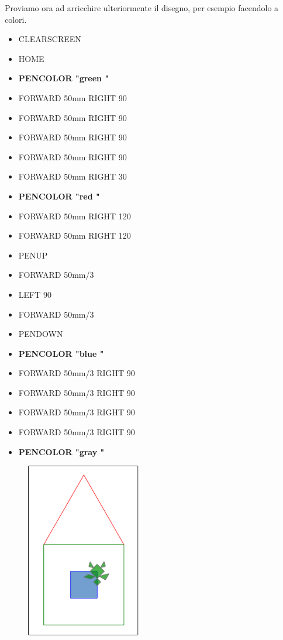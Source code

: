\vskip 1cm

Proviamo ora ad arricchire ulteriormente il disegno, per esempio facendolo a colori.  

\vskip 1cm

\begin{scriptsize}
\begin{minipage}{0.40\textwidth}
\begin{itemize}[itemsep=-3pt,parsep=2pt]
\item[] CLEARSCREEN             
\item[] HOME
\item[] \textbf{PENCOLOR  "green "}
\item[] FORWARD 50mm RIGHT 90
\item[] FORWARD 50mm RIGHT 90
\item[] FORWARD 50mm RIGHT 90
\item[] FORWARD 50mm RIGHT 90
\item[] FORWARD 50mm RIGHT 30
\item[] \textbf{PENCOLOR  "red "}
\item[] FORWARD 50mm RIGHT 120
\item[] FORWARD 50mm RIGHT 120
\item[] PENUP
\item[] FORWARD 50mm/3
\item[] LEFT 90
\item[] FORWARD 50mm/3
\item[] PENDOWN
\item[] \textbf{PENCOLOR  "blue "}
\item[] FORWARD 50mm/3 RIGHT 90
\item[] FORWARD 50mm/3 RIGHT 90
\item[] FORWARD 50mm/3 RIGHT 90
\item[] FORWARD 50mm/3 RIGHT 90
\item[] \textbf{PENCOLOR  "gray "}
\end{itemize}
\end{minipage}
\end{scriptsize}
\begin{minipage}{0.4\textwidth}
\begin{figure}[H]
   \includegraphics[width=5.0cm,trim=4 4 8 4,clip]{./images/disegnare/disegnare-10.png}
   \label{dis-10}
\end{figure}
\end{minipage} \hfill

